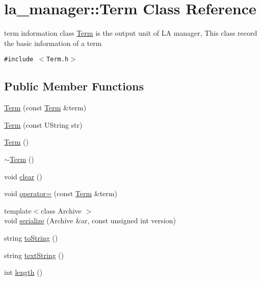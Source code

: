 \hypertarget{classla__manager_1_1Term}{
\section{la\_\-manager::Term Class Reference}
\label{classla__manager_1_1Term}
}
term information class \hyperlink{classla__manager_1_1Term}{Term} is the output unit of LA manager, This class record the basic information of a term  


{\tt \#include $<$Term.h$>$}

\subsection*{Public Member Functions}
\begin{CompactItemize}
\item 
\hyperlink{classla__manager_1_1Term_7f92bddd0d409bd0c9318264f75b9ce5}{Term} (const \hyperlink{classla__manager_1_1Term}{Term} \&term)
\item 
\hyperlink{classla__manager_1_1Term_49f7d019382b79db90b59acc1bedcb2e}{Term} (const UString str)
\item 
\hyperlink{classla__manager_1_1Term_0c8141cae425201896fefd48f1d5801e}{Term} ()
\item 
\hyperlink{classla__manager_1_1Term_92895b8a4abc28c7694ab188369ea5e7}{$\sim$Term} ()
\item 
void \hyperlink{classla__manager_1_1Term_b983fdd373e53addabc00c3a48a46df2}{clear} ()
\item 
void \hyperlink{classla__manager_1_1Term_6d2214c0b4855630660b34cf293ce333}{operator=} (const \hyperlink{classla__manager_1_1Term}{Term} \&term)
\item 
{\footnotesize template$<$class Archive $>$ }\\void \hyperlink{classla__manager_1_1Term_48b8e8e2c1aefacb9bdd5a026275df34}{serialize} (Archive \&ar, const unsigned int version)
\item 
string \hyperlink{classla__manager_1_1Term_8bc20da98085c9587bc868cb3c04dde0}{toString} ()
\item 
string \hyperlink{classla__manager_1_1Term_3b14e0d76b2a6519639a9003ebadb989}{textString} ()
\item 
int \hyperlink{classla__manager_1_1Term_fadc9c8437a99b79102bd8be1f53f337}{length} ()
\end{CompactItemize}
